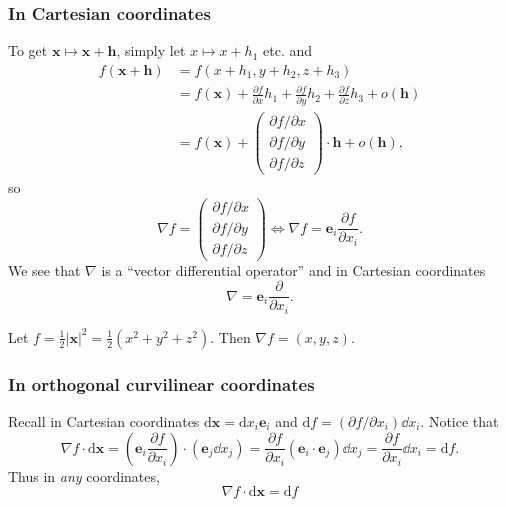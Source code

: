 \subsubsection*{In Cartesian coordinates}
To get $ \mathbf{x} \mapsto \mathbf{x}+\mathbf{h} $, simply let $ x \mapsto x+h_1 $ etc. and 
\begin{align*}
    f(\mathbf{x}+\mathbf{h}) &= f(x+h_1,y+h_2,z+h_3)\\ 
    &= f(\mathbf{x}) + \frac{\partial f}{\partial x}h_1+\frac{\partial f}{\partial y}h_2+\frac{\partial f}{\partial z}h_3 +o(\mathbf{h})\\ 
    &= f(\mathbf{x})+ \begin{pmatrix}
        \partial f/\partial x  \\ \partial f/\partial y  \\ \partial f/\partial z 
    \end{pmatrix}\cdot \mathbf{h}+o(\mathbf{h}),
\end{align*}
so 
\[
    \nabla f = \begin{pmatrix}
        \partial f/\partial x  \\ \partial f/\partial y  \\ \partial f/\partial z 
    \end{pmatrix} \Longleftrightarrow \nabla f = \mathbf{e}_i \frac{\partial f}{\partial x_i}.
\]
We see that $ \nabla $ is a ``vector differential operator'' and in Cartesian coordinates
\[
    \nabla = \mathbf{e}_i \frac{\partial }{\partial x_i} . 
\]

\begin{example}
    Let $ f=\frac{1}{2}|\mathbf{x}|^2 = \frac{1}{2}(x^2+y^2+z^2) $. Then $ \nabla f = (x,y,z) $.
\end{example}

\subsubsection*{In orthogonal curvilinear coordinates}
Recall in Cartesian coordinates $ \mathrm{d} \mathbf{x} = \mathrm{d} x_i \mathbf{e}_i $ and $ \mathrm{d} f = (\partial f/\partial x_i )\dd x_i $. Notice that
\[
    \nabla f \cdot \mathrm{d} \mathbf{x} = \left( \mathbf{e}_i \frac{\partial f}{\partial x_i}  \right) \cdot \left( \mathbf{e}_j \dd x_j \right) = \frac{\partial f}{\partial x_i}(\mathbf{e}_i\cdot \mathbf{e}_j) \dd x_j = \frac{\partial f}{\partial x_i}\dd x_i = \mathrm{d} f.  
\]
Thus in \textit{any} coordinates, 
\[
    \boxed{\nabla f\cdot \mathrm{d} \mathbf{x} = \mathrm{d} f}
\] 

